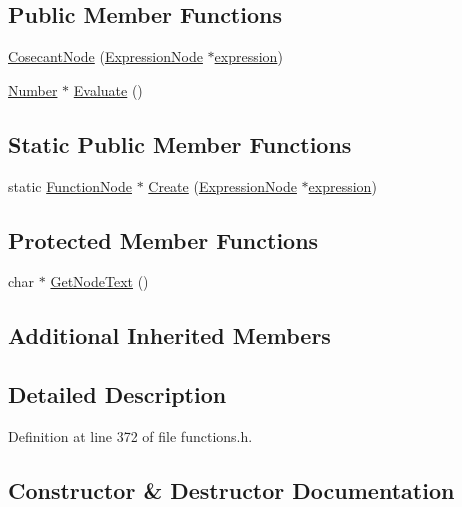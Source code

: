 \subsection*{Public Member Functions}
\begin{DoxyCompactItemize}
\item 
\hyperlink{classCosecantNode_a4e92c76b2ee0b9001f935bdf8b572992}{Cosecant\+Node} (\hyperlink{classExpressionNode}{Expression\+Node} $\ast$\hyperlink{classFunctionNode_ad7577b179a1937aaf8a0058bb5b546dc}{expression})
\item 
\hyperlink{structNumber}{Number} $\ast$ \hyperlink{classCosecantNode_a56ecfcf72005dc95477c95df291609e9}{Evaluate} ()
\end{DoxyCompactItemize}
\subsection*{Static Public Member Functions}
\begin{DoxyCompactItemize}
\item 
static \hyperlink{classFunctionNode}{Function\+Node} $\ast$ \hyperlink{classCosecantNode_a8c69199ee5f01bfbb9c5e536626c71a3}{Create} (\hyperlink{classExpressionNode}{Expression\+Node} $\ast$\hyperlink{classFunctionNode_ad7577b179a1937aaf8a0058bb5b546dc}{expression})
\end{DoxyCompactItemize}
\subsection*{Protected Member Functions}
\begin{DoxyCompactItemize}
\item 
char $\ast$ \hyperlink{classCosecantNode_aedd716ab2e6e2a562718168ea3e4a367}{Get\+Node\+Text} ()
\end{DoxyCompactItemize}
\subsection*{Additional Inherited Members}


\subsection{Detailed Description}


Definition at line 372 of file functions.\+h.



\subsection{Constructor \& Destructor Documentation}
